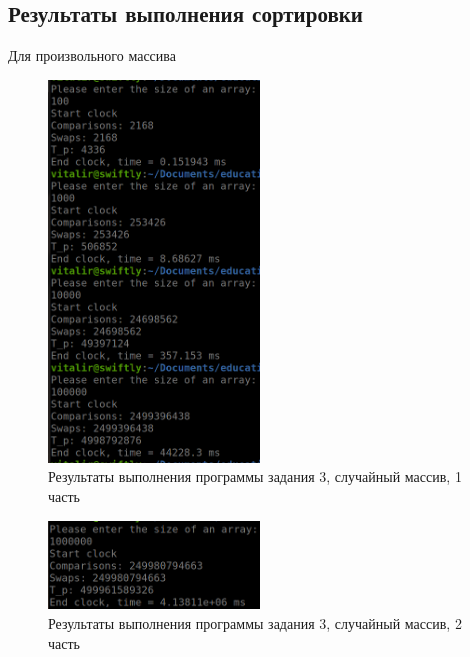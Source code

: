 \documentclass[14pt]{extarticle}
\begin{document}
\subsection{Результаты выполнения сортировки}
Для произвольного массива
\begin{figure}[htpb]
  \centering
  \includegraphics[width=0.5\textwidth]{pictures/alg3_speed1.png}
  \caption{Результаты выполнения программы задания 3, случайный массив, 1 часть}
  \label{fig:alg2_speed_general1}
\end{figure}

\begin{figure}[htpb]
  \centering
  \includegraphics[width=0.5\textwidth]{pictures/alg3_speed2.png}
  \caption{Результаты выполнения программы задания 3, случайный массив, 2 часть}
  \label{fig:alg2_speed_general2}
\end{figure}
\end{document}
